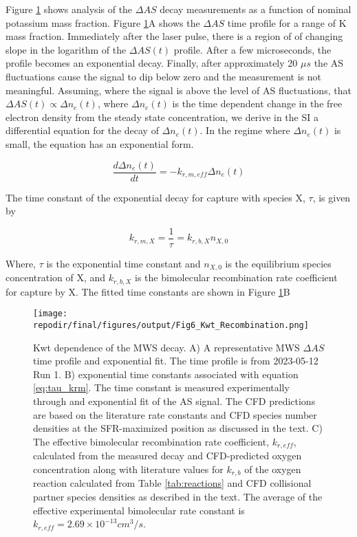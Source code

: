Figure \ref{fig:kwt_recombination} shows analysis of the $\Delta AS$ decay measurements as a function of nominal potassium mass fraction.  Figure \ref{fig:kwt_recombination}A shows the $\Delta AS$ time profile for a range of K mass fraction. Immediately after the laser pulse, there is a region of of changing slope in the logarithm of the $\Delta AS (t)$ profile. After a few microseconds, the profile becomes an exponential decay. Finally, after approximately 20 $\mu s$ the AS fluctuations cause the signal to dip below zero and the measurement is not meaningful. Assuming, where the signal is above the level of AS fluctuations, that $\Delta AS (t) \propto \Delta n_e (t)$, where $\Delta n_e (t)$ is the time dependent change in the free electron density from the steady state concentration, we derive in the SI a differential equation for the decay of $\Delta n_e (t)$. In the regime where $\Delta n_e (t)$ is small, the equation has an exponential form.  

\begin{equation}
    \label{eq:fit_eq}
    \frac{d\Delta n_e (t)}{dt} = - k_{r, m, eff} \Delta n_e (t) 
\end{equation}

The time constant of the exponential decay for capture with species X, $\tau$, is given by

\begin{equation}
    \label{eq:tau_krm}
    k_{r, m, X} = \frac{1}{\tau} = k_{r, b, X}n_{X,0}
\end{equation}

Where, $\tau$ is the exponential time constant and $n_{X,0}$ is the equilibrium species concentration of X, and $k_{r, b, X}$ is the bimolecular recombination rate coefficient for capture by X. The fitted time constants are shown in Figure \ref{fig:kwt_recombination}B 


\begin{figure}[h]
    \texttt{[image: \\repodir/final/figures/output/Fig6\_Kwt\_Recombination.png]} 
    \centering
    \caption{Kwt dependence of the MWS decay. A) A representative MWS $\Delta AS$ time profile and exponential fit. The time profile is from 2023-05-12 Run 1. B) exponential time constants associated with equation \ref{eq:tau_krm}. The time constant is measured experimentally through and exponential fit of the AS signal. The CFD predictions are based on the literature rate constants and CFD species number densities at the SFR-maximized position as discussed in the text. C) The effective bimolecular recombination rate coefficient, $k_{r,eff}$, calculated from the measured decay and CFD-predicted oxygen concentration along with literature values for $k_{r,b}$ of the oxygen reaction calculated from Table \ref{tab:reactions} and CFD collisional partner species densities as described in the text. The average of the effective experimental bimolecular rate constant is $k_{r,eff} =  2.69 \times 10^{-13} cm^3/s$.}
    \label{fig:kwt_recombination}
\end{figure}


